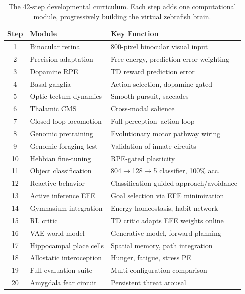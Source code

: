 \documentclass[12pt]{article}
\begin{document}
\begin{table}[H]
\centering
\caption{The 42-step developmental curriculum.
  Each step adds one computational module, progressively building
  the virtual zebrafish brain.}
\label{tab:steps}
\small
\begin{tabular}{clp{7cm}}
\toprule
Step & Module & Key Function \\
\midrule
1  & Binocular retina        & 800-pixel binocular visual input \\
2  & Precision adaptation     & Free energy, prediction error weighting \\
3  & Dopamine RPE            & TD reward prediction error \\
4  & Basal ganglia           & Action selection, dopamine-gated \\
5  & Optic tectum dynamics   & Smooth pursuit, saccades \\
6  & Thalamic CMS            & Cross-modal salience \\
7  & Closed-loop locomotion  & Full perception--action loop \\
8  & Genomic pretraining     & Evolutionary motor pathway wiring \\
9  & Genomic foraging test   & Validation of innate circuits \\
10 & Hebbian fine-tuning     & RPE-gated plasticity \\
11 & Object classification   & 804$\to$128$\to$5 classifier, 100\% acc.\ \\
12 & Reactive behavior       & Classification-guided approach/avoidance \\
13 & Active inference EFE    & Goal selection via EFE minimization \\
14 & Gymnasium integration   & Energy homeostasis, habit network \\
15 & RL critic               & TD critic adapts EFE weights online \\
16 & VAE world model         & Generative model, forward planning \\
17 & Hippocampal place cells & Spatial memory, path integration \\
18 & Allostatic interoception & Hunger, fatigue, stress PE \\
19 & Full evaluation suite   & Multi-configuration comparison \\
20 & Amygdala fear circuit   & Persistent threat arousal \\

\end{tabular}
\end{table}
\end{document}

